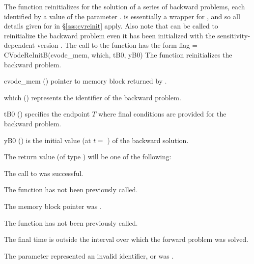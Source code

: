The function  reinitializes {\cvodes} for the solution of a series
of backward problems, each identified by a value of the parameter .
 is essentially a wrapper for , and so
all details given for  in \S\ref{sss:cvreinit}
apply.  Also note that  can be called to
reinitialize the backward problem even it has been initialized with the
sensitivity-dependent version .
The call to the  function has the form
{
  flag = CVodeReInitB(cvode\_mem, which, tB0, yB0)
}
{
  The function  reinitializes {\cvodes} the backward problem.
}
{
  \begin{args}
  \item[cvode\_mem] ()
    pointer to {\cvodes} memory block returned by .
  \item[which] ()
    represents the identifier of the backward problem.
  \item[tB0] ()
    specifies the endpoint $T$ where final conditions are provided for the 
    backward problem.
  \item[yB0] ()
    is the initial value (at $t =$ ) of the backward solution.
  \end{args}
}
{
  The return value  (of type ) will be one of the following:
  \begin{args}
  \item[\Id{CV\_SUCCESS}]
    The call to  was successful.
  \item[\Id{CV\_NO\_MALLOC}]
    The function  has not been previously called.
  \item[\Id{CV\_MEM\_NULL}] 
    The  memory block pointer was .
  \item[\Id{CV\_NO\_ADJ}]
    The function  has not been previously called.
  \item[\Id{CV\_BAD\_TB0}]
    The final time  is outside the interval over which the forward problem
    was solved.
  \item[\Id{CV\_ILL\_INPUT}]
    The parameter  represented an invalid identifier, or
     was .
  \end{args}
}
{}


